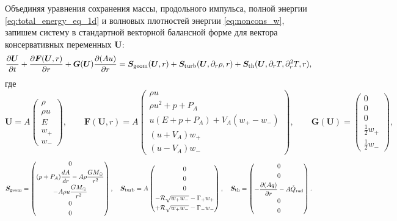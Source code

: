 \documentclass[11pt,a4paper]{article}
\begin{document}
Объединяя уравнения сохранения массы, продольного импульса, полной энергии \eqref{eq:total_energy_eq_1d} и волновых плотностей энергии \eqref{eq:noncons_w}, запишем систему в стандартной векторной балансной форме для вектора консервативных переменных $\bm{U}$:
\begin{equation}
\frac{\partial\bm{U}}{\partial t} + \frac{\partial\bm{F}(\bm{U}, r)}{\partial r} + \bm{G}(\bm{U})\frac{\partial(Au)}{\partial r} = \bm{S}_{\rm geom}(\bm{U}, r) + \bm{S}_{\rm turb}(\bm{U}, \partial_r\rho, r) + \bm{S}_{\rm th}(\bm{U}, \partial_r T, \partial_r^2 T, r),
\label{eq:master_system}
\end{equation}
где
\begin{equation}
\bm{U} = A\begin{pmatrix}
\rho \\[3pt]
\rho u \\[3pt]
E \\[3pt]
w_+ \\[3pt]
w_-
\end{pmatrix}, \qquad
\bm{F}(\bm{U}, r) = A\begin{pmatrix}
\rho u \\[3pt]
\rho u^2 + p + P_A \\[3pt]
u(E + p + P_A) + V_A(w_+ - w_-) \\[3pt]
(u + V_A)w_+ \\[3pt]
(u - V_A)w_-
\end{pmatrix}, \qquad
\bm{G}(\bm{U}) = \begin{pmatrix}
0 \\[3pt]
0 \\[3pt]
0 \\[3pt]
\frac{1}{2}w_+ \\[3pt]
\frac{1}{2}w_-
\end{pmatrix},
\label{eq:cons_vectors}
\end{equation}
\begin{equation}
\bm{S}_{\rm geom} = \begin{pmatrix}
0 \\[3pt]
(p + P_A)\dfrac{dA}{dr} - A\rho\dfrac{GM_\odot}{r^2} \\[6pt]
-A\rho u\dfrac{GM_\odot}{r^2} \\[6pt]
0 \\[3pt]
0
\end{pmatrix}, \quad
\bm{S}_{\rm turb} = A\begin{pmatrix}
0 \\[3pt]
0 \\[3pt]
0 \\[3pt]
-\mathcal{R}\sqrt{w_+ w_-} - \Gamma_+ w_+ \\[3pt]
+\mathcal{R}\sqrt{w_+ w_-} - \Gamma_- w_-
\end{pmatrix}, \quad
\bm{S}_{\rm th} = \begin{pmatrix}
0 \\[3pt]
0 \\[3pt]
-\dfrac{\partial(Aq)}{\partial r} - A\tilde{Q}_{\rm rad} \\[6pt]
0 \\[3pt]
0
\end{pmatrix}.
\label{eq:source_vectors}
\end{equation}
\end{document}
